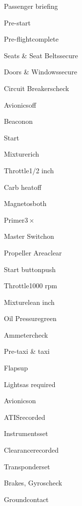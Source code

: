 





\begin{multicols}{2}
\begin{checklist}{Passenger briefing}
\end{checklist}

\begin{checklist}{Pre-start}
    \item{Pre-flight}{complete}
    \item{Seats \& Seat Belts}{secure}
    \item{Doors \& Windows}{secure}
    \item{Circuit Breakers}{check}
    \item{Avionics}{off}
    \item{Beacon}{on}
\end{checklist}

\begin{checklist}{Start}
    \item{Mixture}{rich}
    \item{Throttle}{1/2 inch}
    \item{Carb heat}{off}
    \item{Magnetos}{both}
    \item{Primer}{$3\times$}
    \item{Master Switch}{on}
    \item{Propeller Area}{clear}
    \item{Start button}{push}
    \item{Throttle}{1000 rpm}
    \item{Mixture}{lean  inch}
    \item{Oil Pressure}{green}
    \item{Ammeter}{check}
\end{checklist}

\begin{checklist}{Pre-taxi \& taxi}
    \item{Flaps}{up}
    \item{Lights}{as required}
    \item{Avionics}{on}
    \item{ATIS}{recorded}
    \item{Instruments}{set}
    \item{Clearance}{recorded}
    \item{Transponder}{set}
    \item{Brakes, Gyros}{check}
    \item{Ground}{contact}
\end{checklist}


\end{multicols}
